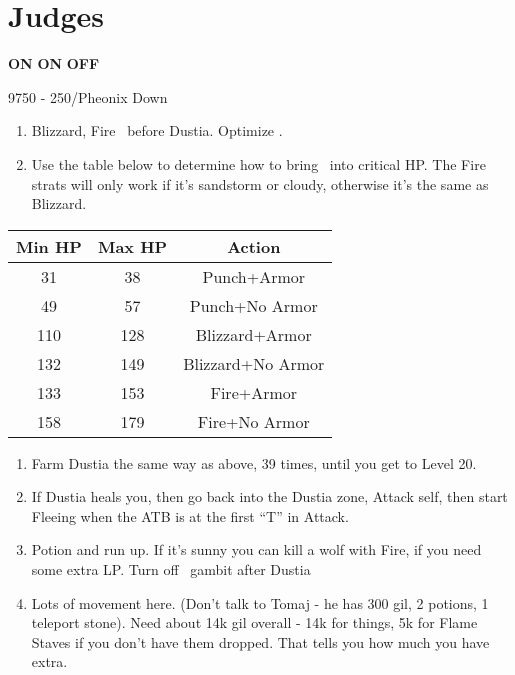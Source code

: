 \chapter{Judges}
\begin{gambit}
	\begin{itemize}
		\vaanf \textbf{ON}
		\balthierf \textbf{ON}
		\franf \textbf{OFF}
	\end{itemize}
\end{gambit}
\begin{shop}{9750 - 250/Pheonix Down}
\end{shop}
\begin{enumerate}
	\item Blizzard, Fire \vaan\ before Dustia. Optimize \vaan.
	\item Use the table below to determine how to bring \vaan\ into critical HP. The Fire strats will only work if it's sandstorm or cloudy, otherwise it's the same as Blizzard.
\end{enumerate}
\begin{center}
	\begin{tabular}{|c|c|c|} \hline
	Min HP & Max HP & Action \\ \hline
	      31	& 38&	Punch+Armor\\ \hline
	      49	&57	&Punch+No Armor\\ \hline
	      110	&128	&Blizzard+Armor\\ \hline
	      132	&149	&Blizzard+No Armor\\ \hline
	      133	&153	&Fire+Armor\\ \hline
	      158	&179	&Fire+No Armor\\ \hline
	\end{tabular}
\end{center}
\begin{enumerate}
	\item Farm Dustia the same way as above, 39 times, until you get to Level 20.
	\item If Dustia heals you, then go back into the Dustia zone, Attack self, then start Fleeing when the ATB is at the first ``T'' in Attack.
	\item Potion and run up. If it's sunny you can kill a wolf with Fire, if you need some extra LP. Turn off \vaan\ gambit after Dustia
	\item Lots of movement here. (Don't talk to Tomaj - he has 300 gil, 2 potions, 1 teleport stone). Need about 14k gil overall - 14k for things, 5k for Flame Staves if you don't have them dropped. That tells you how much you have extra.
\end{enumerate}
